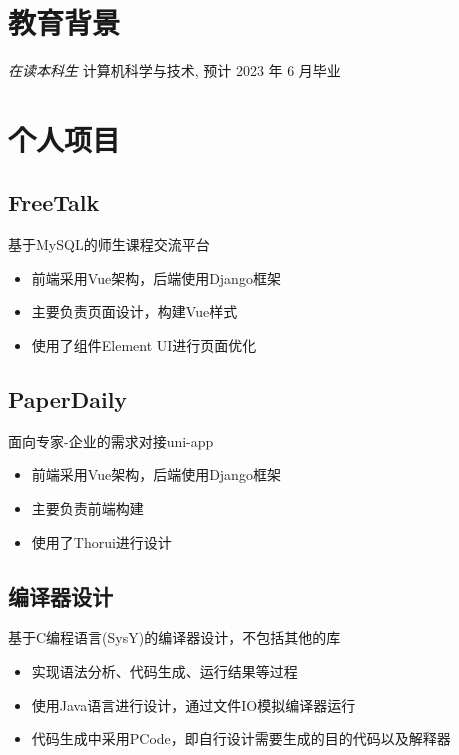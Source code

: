 \documentclass{resume}
\begin{document}


 
\section{\faGraduationCap  教育背景}
\textit{在读本科生} \space
计算机科学与技术, 预计 2023 年 6 月毕业

\section{\faUsers 个人项目}

\begin{onehalfspacing}
\subsection{\textbf{FreeTalk}
}
基于MySQL的师生课程交流平台
\begin{itemize}
\item 前端采用Vue架构，后端使用Django框架
\item 主要负责页面设计，构建Vue样式
\item 使用了组件Element UI进行页面优化
\end{itemize}
\end{onehalfspacing}

\begin{onehalfspacing}
\subsection{\textbf{PaperDaily}
}
面向专家-企业的需求对接uni-app
\begin{itemize}
\item 前端采用Vue架构，后端使用Django框架
\item 主要负责前端构建
\item 使用了Thorui进行设计
\end{itemize}
\end{onehalfspacing}

\begin{onehalfspacing}
\subsection{\textbf{编译器设计}}
基于C编程语言(SysY)的编译器设计，不包括其他的库
\begin{itemize}

\item 实现语法分析、代码生成、运行结果等过程
\item 使用Java语言进行设计，通过文件IO模拟编译器运行
\item 代码生成中采用PCode，即自行设计需要生成的目的代码以及解释器
\end{itemize}

\end{onehalfspacing}
\end{document}
